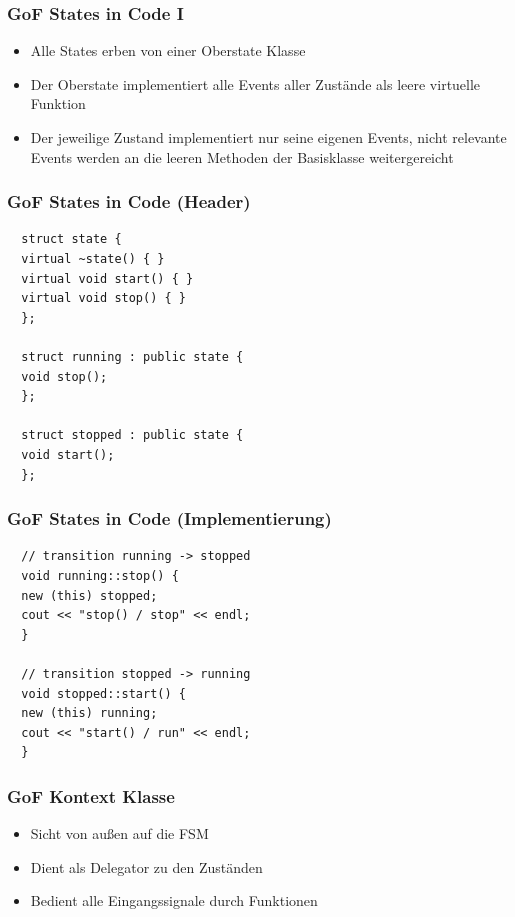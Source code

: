 \documentclass{beamer}
\begin{document}
\begin{frame}
 \frametitle{GoF States in Code I}
 \begin{itemize}
  \item Alle States erben von einer Oberstate Klasse
  \item Der Oberstate implementiert alle Events aller Zust\"ande als leere virtuelle Funktion
  \item Der jeweilige Zustand implementiert nur seine eigenen Events, nicht relevante
  Events werden an die leeren Methoden der Basisklasse weitergereicht
 \end{itemize}
\end{frame}

\begin{frame}[fragile]
 \frametitle{GoF States in Code (Header)}
 \begin{lstlisting}
  struct state {
  virtual ~state() { }
  virtual void start() { }
  virtual void stop() { }
  };

  struct running : public state {
  void stop();
  };

  struct stopped : public state {
  void start();
  };
 \end{lstlisting}
\end{frame}

\begin{frame}[fragile]
 \frametitle{GoF States in Code (Implementierung)}
 \begin{lstlisting}
  // transition running -> stopped
  void running::stop() {
  new (this) stopped;
  cout << "stop() / stop" << endl;
  }

  // transition stopped -> running
  void stopped::start() {
  new (this) running;
  cout << "start() / run" << endl;
  }
 \end{lstlisting}
\end{frame}

\begin{frame}
 \frametitle{GoF Kontext Klasse}
 \begin{itemize}
  \item Sicht von au{\ss}en auf die FSM
  \item Dient als Delegator zu den Zust\"anden
  \item Bedient alle Eingangssignale durch Funktionen
 \end{itemize}
\end{frame}
\end{document}
